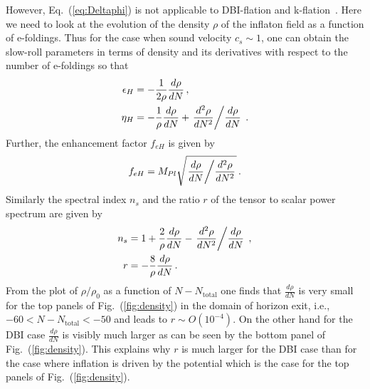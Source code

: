 \documentclass[12pt]{article}
\begin{document}
However, Eq.~(\ref{eq:Deltaphi}) is not applicable to DBI-flation and k-flation~\cite{Garriga:1999vw}.
Here we need to look at the evolution of the density $\rho$ of the inflaton field as a function of e-foldings.
Thus for the case when sound velocity $c_s \sim 1$, one can obtain the slow-roll parameters in terms of density and its derivatives with respect to the number of e-foldings so that
\begin{equation}
  \begin{aligned}
    \epsilon_H &= -\frac{1}{2 \rho} \frac{d\rho}{dN}\,,\\
    \eta_H &= -\frac{1}{\rho} \frac{d\rho}{dN} + \left.\frac{d^2\rho}{dN^2} \middle/ \frac{d\rho}{dN}\right.\,.
  \end{aligned}
\end{equation}
Further, the enhancement factor $f_{eH}$ is given by
\begin{equation}
  f_{eH} = M_{Pl} \sqrt{\left.\frac{d\rho}{dN} \middle/ \frac{d^2\rho}{dN^2}\right.}\,.
\end{equation}
Similarly the spectral index $n_s$ and the ratio $r$ of the tensor to scalar power spectrum are given by
\begin{equation} \label{eq:rFromDDensityDN}
  \begin{aligned}
    n_s &= 1 + \frac{2}{\rho} \frac{d\rho}{dN} - \left.\frac{d^2\rho}{dN^2} \middle/ \frac{d\rho}{dN}\right.\,,\\
    r &= - \frac{8}{\rho} \frac{d\rho}{dN}\,.
  \end{aligned}
\end{equation}
From the plot of $\rho / \rho_0$ as a function of $N - N_{\text{total}}$ one finds that $\frac{d\rho}{dN}$ is very small for the top panels of Fig.~(\ref{fig:density}) in the domain of horizon exit, i.e., $-60 < N - N_\text{total} < -50$ and leads to $r \sim O\left(10^{-4}\right)$.
On the other hand for the DBI case $\frac{d\rho}{dN}$ is visibly much larger as can be seen by the bottom panel of Fig.~(\ref{fig:density}).
This explains why $r$ is much larger for the DBI case than for the case where inflation is driven by the potential which is the case for the top panels of Fig.~(\ref{fig:density}).
\end{document}
